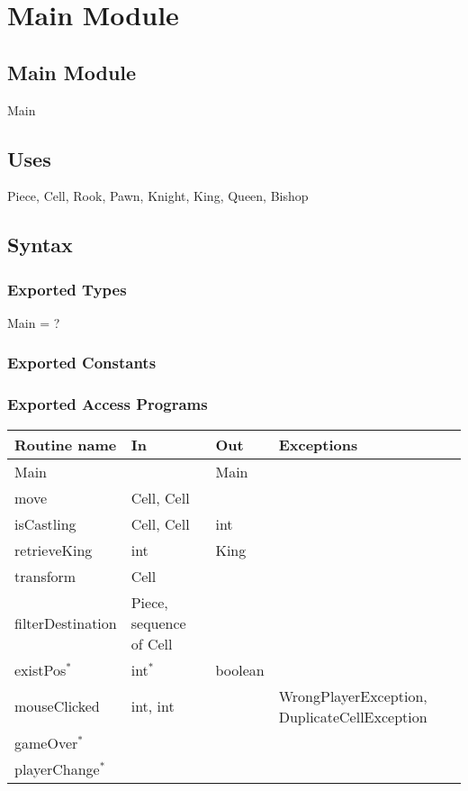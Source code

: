 \documentclass[12pt]{article}
\begin{document}
\newpage



\section* {Main Module}

\subsection* {Main Module}

Main

\subsection* {Uses}

Piece, Cell, Rook, Pawn, Knight, King, Queen, Bishop

\subsection* {Syntax}

\subsubsection* {Exported Types}
Main = ?

\subsubsection* {Exported Constants}

\subsubsection* {Exported Access Programs}

\begin{tabular}{| l | l | l | p{5cm} |}
\hline
\textbf{Routine name} & \textbf{In} & \textbf{Out} & \textbf{Exceptions}\\
\hline
Main & ~ & Main & ~\\
\hline
move & Cell, Cell & ~ & ~\\
\hline
isCastling & Cell, Cell & int & ~\\
\hline
retrieveKing & int & King & ~\\
\hline
transform & Cell & ~ & ~\\
\hline
filterDestination & Piece, sequence of Cell & ~ & ~\\
\hline
existPos$^{*}$ & int$^{*}$ & boolean & ~\\
\hline
mouseClicked & int, int & ~ & WrongPlayerException, DuplicateCellException\\
\hline
gameOver$^{*}$ &~& ~ & ~\\
\hline
playerChange$^{*}$ &~ & ~ & ~\\
\hline

\end{tabular}\\
\end{document}
